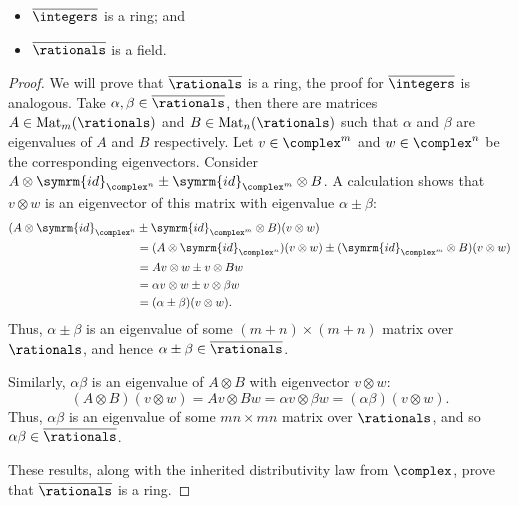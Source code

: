 \documentclass[fleqn]{NotesClass}
\newcommand{\id}{\symrm{id}}
\DeclareMathOperator{\Mat}{Mat}
\newcommand{\algNumbers}{\overline{\rationals}}
\newcommand{\algIntegers}{\overline{\integers}}
\begin{document}
    \begin{prp}{}{}
        \begin{itemize}
            \item \(\algIntegers\) is a ring; and
            \item \(\algNumbers\) is a field.
        \end{itemize}
        \begin{proof}
            \Step{\(\algNumbers\) and \(\algIntegers\) are Rings}
            We will prove that \(\algNumbers\) is a ring, the proof for \(\algIntegers\) is analogous.
            Take \(\alpha, \beta \in \algNumbers\), then there are matrices \(A \in \Mat_m(\rationals)\) and \(B \in \Mat_n(\rationals)\) such that \(\alpha\) and \(\beta\) are eigenvalues of \(A\) and \(B\) respectively.
            Let \(v \in \complex^m\) and \(w \in \complex^n\) be the corresponding eigenvectors.
            Consider \(A \otimes \id_{\complex^n} \pm \id_{\complex^{m}} \otimes B\).
            A calculation shows that \(v \otimes w\) is an eigenvector of this matrix with eigenvalue \(\alpha \pm \beta\):
            \begin{align}
                (A \otimes \id_{\complex^n} &\pm \id_{\complex^{m}} \otimes B)(v \otimes w)\\
                &= (A \otimes \id_{\complex^n})(v \otimes w) \pm (\id_{\complex^m} \otimes B)(v \otimes w)\\
                &= Av \otimes w \pm v \otimes Bw\\
                &= \alpha v \otimes w \pm v \otimes \beta w\\
                &= (\alpha \pm \beta) (v \otimes w).
            \end{align}
            Thus, \(\alpha \pm \beta\) is an eigenvalue of some \((m + n) \times (m + n)\) matrix over \(\rationals\), and hence \(\alpha \pm \beta \in \algNumbers\).
            
            Similarly, \(\alpha\beta\) is an eigenvalue of \(A \otimes B\) with eigenvector \(v \otimes w\):
            \begin{equation}
                (A \otimes B)(v \otimes w) = Av \otimes Bw = \alpha v \otimes \beta w = (\alpha\beta)(v \otimes w).
            \end{equation}
            Thus, \(\alpha\beta\) is an eigenvalue of some \(mn \times mn\) matrix over \(\rationals\), and so \(\alpha\beta \in \algNumbers\).
            
            These results, along with the inherited distributivity law from \(\complex\), prove that \(\algNumbers\) is a ring.
            

\end{proof}
\end{prp}
\end{document}
